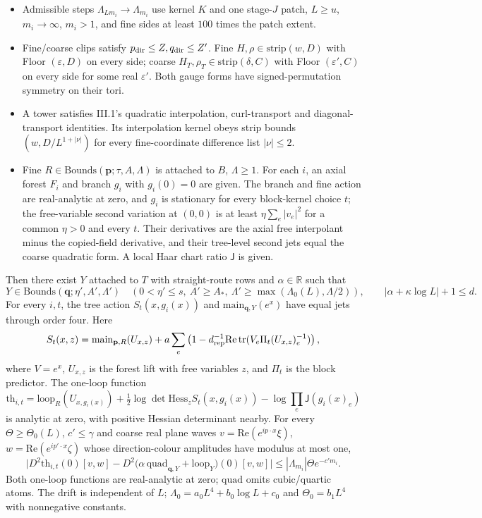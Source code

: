 \documentclass[
  letterpaper,
  11pt]{article}
\providecommand{\tightlist}{%
  \setlength{\itemsep}{0pt}\setlength{\parskip}{0pt}}
\begin{document}
\begin{itemize}
\tightlist
\item
  Admissible steps \(\Lambda_{Lm_i}\to\Lambda_{m_i}\) use kernel \(K\)
  and one stage-\(J\) patch, \(L\ge u\), \(m_i\to\infty\), \(m_i>1\),
  and fine sides at least \(100\) times the patch extent.
\item
  Fine/coarse clips satisfy \(p_{\rm dir}\le Z,q_{\rm dir}\le Z'\). Fine
  \(H,\rho\in\mathrm{strip}(w,D)\) with Floor \((\varepsilon,D)\) on
  every side; coarse \(H_T,\rho_T\in\mathrm{strip}(\delta,C)\) with
  Floor \((\varepsilon',C)\) on every side for some real
  \(\varepsilon'\). Both gauge forms have signed-permutation symmetry on
  their tori.
\item
  A tower satisfies III.1's quadratic interpolation, curl-transport and
  diagonal-transport identities. Its interpolation kernel obeys strip
  bounds \((w,D/L^{1+|\nu|})\) for every fine-coordinate difference list
  \(|\nu|\le2\).
\item
  Fine \(R\in\mathrm{Bounds}(\mathbf p;\tau,A,\Lambda)\) is attached to
  \(B\), \(\Lambda\ge1\). For each \(i\), an axial forest \(F_i\) and
  branch \(g_i\) with \(g_i(0)=0\) are given. The branch and fine action
  are real-analytic at zero, and \(g_i\) is stationary for every
  block-kernel choice \(t\); the free-variable second variation at
  \((0,0)\) is at least \(\eta\sum_e|v_e|^2\) for a common \(\eta>0\)
  and every \(t\). Their derivatives are the axial free interpolant
  minus the copied-field derivative, and their tree-level second jets
  equal the coarse quadratic form. A local Haar chart ratio
  \(\mathsf J\) is given.
\end{itemize}

Then there exist \(Y\) attached to \(T\) with straight-route rows and
\(\alpha\in\mathbb R\) such that
\[Y\in\mathrm{Bounds}(\mathbf q;\eta',A',\Lambda')\quad(0<\eta'\le s,\ A'\ge A_*,\ \Lambda'\ge\max(\Lambda_0(L),\Lambda/2)),\qquad |\alpha+\kappa\log L|+1\le d.\]
For every \(i,t\), the tree action \(S_t(x,g_i(x))\) and
\(\mathrm{main}_{\mathbf q,Y}(e^x)\) have equal jets through order four.
Here
\[S_t(x,z)=\mathrm{main}_{\mathbf p,R}(U_{x,z})+a\sum_e\left(1-d_{\rm rep}^{-1}\mathrm{Re}\,\mathrm{tr}(V_e\Pi_t(U_{x,z})_e^{-1})\right),\]
where \(V=e^x\), \(U_{x,z}\) is the forest lift with free variables
\(z\), and \(\Pi_t\) is the block predictor. The one-loop function
\[\mathrm{th}_{i,t}=\mathrm{loop}_R(U_{x,g_i(x)})+\tfrac12\log\det\mathrm{Hess}_zS_t(x,g_i(x))-\log\prod_e\mathsf J(g_i(x)_e)\]
is analytic at zero, with positive Hessian determinant nearby. For every
\(\Theta\ge\Theta_0(L)\), \(c'\le\gamma\) and coarse real plane waves
\(v=\mathrm{Re}(e^{ip\cdot x}\xi)\),
\(w=\mathrm{Re}(e^{ip'\cdot x}\zeta)\) whose direction-colour amplitudes
have modulus at most one,
\[\Big|D^2\mathrm{th}_{i,t}(0)[v,w]-D^2\big(\alpha\,\mathrm{quad}_{\mathbf q,Y}+\mathrm{loop}_Y\big)(0)[v,w]\Big|\le|\Lambda_{m_i}|\Theta e^{-c'm_i}.\]
Both one-loop functions are real-analytic at zero; \(\mathrm{quad}\)
omits cubic/quartic atoms. The drift is independent of \(L\);
\(\Lambda_0=a_0L^4+b_0\log L+c_0\) and \(\Theta_0=b_1L^4\) with
nonnegative constants.
\end{document}
